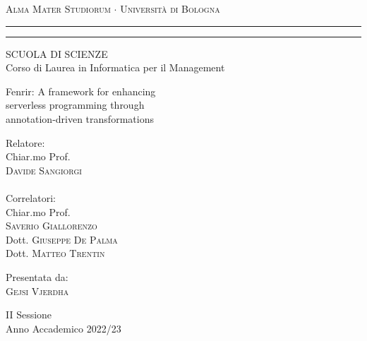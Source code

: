 \begin{otherlanguage}{italian}
\begin{titlepage}
\begin{center}
{{\Large{\textsc{Alma Mater Studiorum $\cdot$ Universit\`a di
Bologna}}}} \rule[0.1cm]{15.8cm}{0.1mm}
\rule[0.5cm]{15.8cm}{0.6mm}
{\small{ SCUOLA DI SCIENZE\\
Corso di Laurea in Informatica per il Management}}
\end{center}
\vspace{15mm}
\begin{center}
{\LARGE{ Fenrir: A framework for enhancing  }}\\ %
\vspace{3mm}
{\LARGE{ serverless programming through  }}\\
\vspace{3mm}
{\LARGE{ annotation-driven transformations }}\\
\end{center}
\vspace{35mm}
\par
\noindent
\begin{minipage}[t]{0.47\textwidth}
{\large{ Relatore:\\
Chiar.mo Prof.\\
\textsc{Davide Sangiorgi}\\\\
Correlatori:\\
Chiar.mo Prof.\\
\textsc{Saverio Giallorenzo}
\\Dott.
\textsc{Giuseppe De Palma}
\\Dott.
\textsc{Matteo Trentin}
}}
\end{minipage}
\hfill
\begin{minipage}[t]{0.47\textwidth}\raggedleft
{\large{ Presentata da:\\
\textsc{Gejsi Vjerdha}}}
\end{minipage}
\vspace{20mm}
\begin{center}
{\large{ II Sessione\\
Anno Accademico 2022/23 }}%
\end{center}
\end{titlepage}
\end{otherlanguage}
